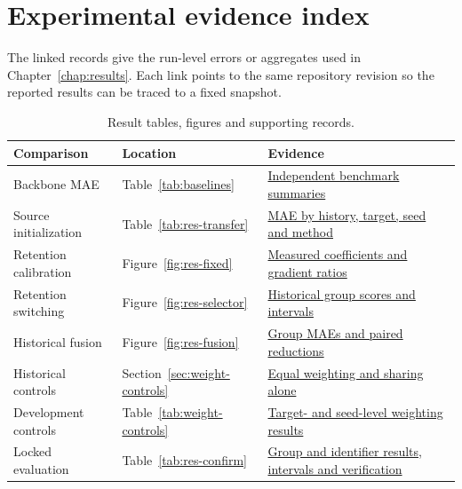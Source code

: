 \chapter{Experimental evidence index}\label{app:evidence}
The linked records give the run-level errors or aggregates used in Chapter~\ref{chap:results}. Each link points to the same repository revision so the reported results can be traced to a fixed snapshot.

\begin{table}[H]\centering\small
\caption{Result tables, figures and supporting records.}
\begin{tabularx}{\linewidth}{@{}l l X@{}}\toprule
Comparison & Location & Evidence\\\midrule
Backbone MAE & Table~\ref{tab:baselines} & \href{https://github.com/HungLD9505/adaptive-retention-ev/tree/0167b5189ed519490ba8361a70e0656c6d7e5850/docs/reports/issue99-teacher-review-20261111}{Independent benchmark summaries}\\
Source initialization & Table~\ref{tab:res-transfer} & \href{https://github.com/HungLD9505/adaptive-retention-ev/blob/0167b5189ed519490ba8361a70e0656c6d7e5850/docs/reports/issue99-history-review-20261110/cells.csv}{MAE by history, target, seed and method}\\
Retention calibration & Figure~\ref{fig:res-fixed} & \href{https://github.com/HungLD9505/adaptive-retention-ev/blob/0167b5189ed519490ba8361a70e0656c6d7e5850/docs/reports/issue99-study-20261110/fixed-trials.csv}{Measured coefficients and gradient ratios}\\
Retention switching & Figure~\ref{fig:res-selector} & \href{https://github.com/HungLD9505/adaptive-retention-ev/blob/0167b5189ed519490ba8361a70e0656c6d7e5850/report/full-results.csv}{Historical group scores and intervals}\\
Historical fusion & Figure~\ref{fig:res-fusion} & \href{https://github.com/HungLD9505/adaptive-retention-ev/blob/0167b5189ed519490ba8361a70e0656c6d7e5850/docs/reports/issue99-full-scope-20261110/group-results.csv}{Group MAEs and paired reductions}\\
Historical controls & Section~\ref{sec:weight-controls} & \href{https://github.com/HungLD9505/adaptive-retention-ev/blob/0167b5189ed519490ba8361a70e0656c6d7e5850/docs/reports/issue99-teacher-review-20261111/fusion-controls-groups.csv}{Equal weighting and sharing alone}\\
Development controls & Table~\ref{tab:weight-controls} & \href{https://github.com/HungLD9505/adaptive-retention-ev/blob/0167b5189ed519490ba8361a70e0656c6d7e5850/docs/reports/issue123-bounded-weighting-20261113/development-mae.csv}{Target- and seed-level weighting results}\\
Locked evaluation & Table~\ref{tab:res-confirm} & \href{https://github.com/HungLD9505/adaptive-retention-ev/tree/0167b5189ed519490ba8361a70e0656c6d7e5850/docs/reports/issue119-confirmation-20261113}{Group and identifier results, intervals and verification}\\
\bottomrule\end{tabularx}\end{table}
